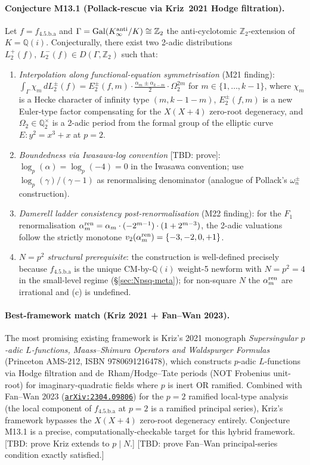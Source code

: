 \documentclass[a4paper,11pt]{article}
\newcommand{\arXiv}[1]{\href{https://arxiv.org/abs/#1}{\texttt{arXiv:#1}}}
\newcommand{\fLM}{f_{\text{4.5.b.a}}}
\newcommand{\Qi}{\mathbb{Q}(i)}
\theoremstyle{definition}
\theoremstyle{remark}
\begin{document}
\paragraph{Conjecture M13.1 (Pollack-rescue via Kriz~2021 Hodge filtration).}
Let $f=\fLM$ and $\Gamma=\mathrm{Gal}(K_{\infty}^{\rm anti}/K)\cong\mathbb{Z}_{2}$
the anti-cyclotomic $\mathbb{Z}_{2}$-extension of $K=\Qi$.  Conjecturally,
there exist two 2-adic distributions
$L^{+}_{2}(f),\ L^{-}_{2}(f) \in D(\Gamma,\mathbb{Z}_{2})$ such that:
\begin{enumerate}
\item[(a)] \emph{Interpolation along functional-equation
symmetrisation} (M21 finding):
$\int_{\Gamma}\chi_{m}\,dL^{\pm}_{2}(f) = E^{\pm}_{2}(f,m) \cdot
\tfrac{\alpha_{m}\pm\alpha_{k-m}}{2}\cdot\Omega_{2}^{2m}$
for $m\in\{1,\dots,k-1\}$, where $\chi_{m}$ is a Hecke character of
infinity type $(m,k-1-m)$, $E^{\pm}_{2}(f,m)$ is a new Euler-type
factor compensating for the $X(X+4)$ zero-root degeneracy, and
$\Omega_{2}\in\mathbb{Q}_{2}^{\times}$ is a 2-adic period from the formal
group of the elliptic curve $E:y^{2}=x^{3}+x$ at $p=2$.

\item[(b)] \emph{Boundedness via Iwasawa-log convention} [TBD: prove]:
$\log_{p}(\alpha)=\log_{p}(-4)=0$ in the Iwasawa convention; use
$\log_{p}(\gamma)/(\gamma-1)$ as renormalising denominator
(analogue of Pollack's $\omega_{n}^{\pm}$ construction).

\item[(c)] \emph{Damerell ladder consistency post-renormalisation}
(M22 finding): for the $F_{1}$ renormalisation
$\alpha_{m}^{\rm ren}=\alpha_{m}\cdot(-2^{m-1})\cdot(1+2^{m-3})$,
the 2-adic valuations follow the strictly monotone
$v_{2}(\alpha_{m}^{\rm ren})=\{-3,-2,0,+1\}$.

\item[(d)] \emph{$N=p^{2}$ structural prerequisite}:
the construction is well-defined precisely because $\fLM$ is the
unique CM-by-$\Qi$ weight-5 newform with $N=p^{2}=4$ in the
small-level regime (\S\ref{sec:Npsq-meta}); for non-square $N$ the
$\alpha_{m}^{\rm ren}$ are irrational and (c) is undefined.
\end{enumerate}

\paragraph{Best-framework match (Kriz 2021 + Fan--Wan 2023).}
The most promising existing framework is Kriz's 2021 monograph
\emph{Supersingular $p$-adic $L$-functions, Maass--Shimura Operators
and Waldspurger Formulas} (Princeton AMS-212, ISBN 9780691216478),
which constructs $p$-adic $L$-functions via Hodge filtration and
de~Rham/Hodge--Tate periods (NOT Frobenius unit-root) for
imaginary-quadratic fields where $p$ is inert OR ramified.  Combined
with Fan--Wan 2023 (\arXiv{2304.09806}) for the $p=2$ ramified
local-type analysis (the local component of $\fLM$ at $p=2$ is a
ramified principal series), Kriz's framework bypasses the $X(X+4)$
zero-root degeneracy entirely.  Conjecture M13.1 is a precise,
computationally-checkable target for this hybrid framework.
[TBD: prove Kriz extends to $p\mid N$.]
[TBD: prove Fan--Wan principal-series condition exactly satisfied.]
\end{document}
